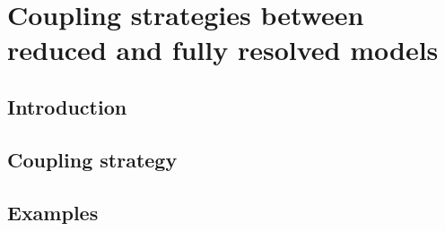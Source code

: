 
\chapter{Coupling strategies between reduced and fully resolved models}
\label{coupling}


\section{Introduction}



\section{Coupling strategy}



\section{Examples}


